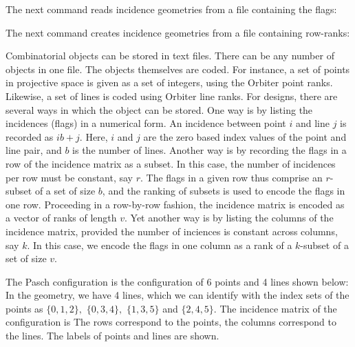 
The next command reads incidence geometries from a file containing the flags:


The next command creates incidence geometries from a file containing row-ranks:



Combinatorial objects can be stored in text files. 
There can be any number of objects in one file.
The objects themselves are coded. 
For instance, a set of points in projective space 
is given as a set of integers, using the Orbiter point ranks. 
Likewise, a set of lines is coded using Orbiter line ranks. 
For designs, there are several ways in which the object can be stored. 
One way is by listing the incidences (flags) in a numerical form. 
An incidence between point $i$ and line $j$ is recorded as $ib+j.$ Here, $i$ and $j$ are the zero based index values of 
the point and line pair, and $b$ is the number of lines.
Another way is by recording the flags in a row of the incidence matrix as a subset. 
In this case, the number of incidences per row must be constant, say $r$. 
The flags in a given row thus comprise an $r$-subset of a set of size $b$, 
and the ranking of subsets is used to encode the flags in one row.
Proceeding in a row-by-row fashion, the incidence matrix is encoded as a vector of ranks of length $v$.
Yet another way is by listing the columns of the incidence matrix, provided the number of inciences is constant across columns, say $k$. 
In this case, we encode the flags in one column as a rank of a $k$-subset of a set of size $v$. 


\bigskip


The Pasch configuration is the configuration of 6 points and 4 lines 
shown below:
In the geometry, we have 4 lines, which we can identify with the index sets of the points as
$\{0,1,2\},$ $\{0,3,4\},$ $\{1,3,5\}$ and $\{2,4,5\}.$ 
The incidence matrix of the configuration is 
The rows correspond to the points, the columns correspond to the lines. 
The labels of points and lines are shown. 

\bigskip


